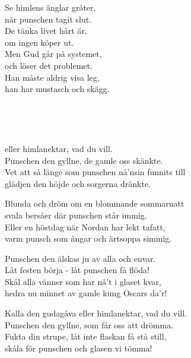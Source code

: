 Se himlens änglar gråter,\\
när punschen tagit slut.\\
De tänka livet hårt är,\\
om ingen köper ut.\\
Men Gud går på systemet,\\
och löser det problemet.\\
Han måste aldrig visa leg,\\
han har mustasch och skägg.

\\

\newpage

 \\       

eller himlanektar, vad du vill.\\ 
Punschen den gyllne, de gamle oss skänkte.\\ 
Vet att så länge som punschen nå'nsin funnits till\\ 
glädjen den höjde och sorgerna dränkte.

Blunda och dröm om en blommande sommarnatt\\ 
svala bersåer där punschen står immig.\\ 
Eller en höstdag när Nordan har lekt tafatt,\\ 
varm punsch som ångar och ärtsoppa simmig.

Punschen den älskas ju av alla och envar.\\ 
Låt festen börja - låt punschen få flöda!\\ 
Skål alla vänner som har nå't i glaset kvar,\\ 
hedra nu minnet av gamle kung Oscars da'r!

Kalla den gudagåva eller himlanektar, vad du vill.\\ 
Punschen den gyllne, som får oss att drömma.\\ 
Fukta din strupe, låt inte flaskan få stå still,\\ 
skåla för punschen och glasen vi tömma!\\ 

\newpage


 \\       
\author{Text: André Mabande}

